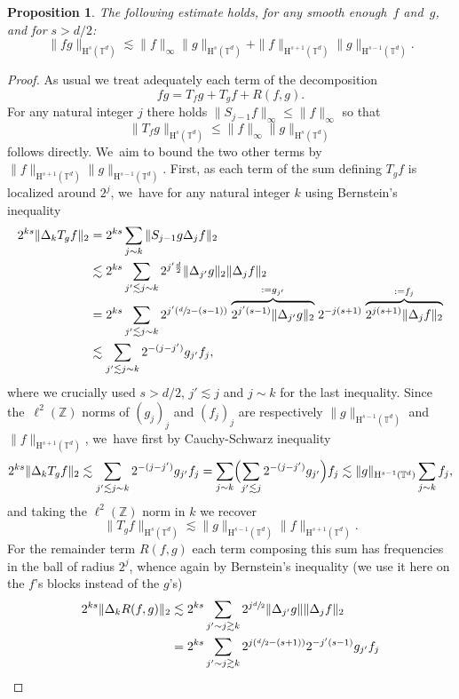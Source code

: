 \documentclass[10pt]{amsart}
\newtheorem{prop}{Proposition}[section]
\theoremstyle{definition}
\newcommand\Z{\mathbb{Z}}
\newcommand\T{\mathbb{T}}
\renewcommand\H{\mathrm{H}}
\begin{document}
\begin{prop}\label{prop:rhsSobo}
The following estimate holds, for any smooth enough~$f$ and~$g$, and for $s>d/2$:
\[
\|f g\|_{\H^s(\T^d)} \lesssim \|f\|_{\infty} \|g\|_{\H^s(\T^d)}+\|f\|_{\H^{s+1}(\T^d)}\|g\|_{\H^{s-1}(\T^d)}.
\]
\end{prop}
\begin{proof}
As usual we treat adequately each term of the decomposition
\[
fg = T_f g + T_g f + R(f,g).
\]
For any natural integer $j$ there holds $\|S_{j-1} f\|_\infty\leq \|f\|_\infty$ so that
\[
\|T_f g\|_{\H^s(\T^d)} \leq \|f\|_\infty \|g\|_{\H^s(\T^d)}
\]
follows directly. We~aim to bound the two other terms by $\|f\|_{\H^{s+1}(\T^d)}\|g\|_{\H^{s-1}(\T^d)}$. First, as each term of the sum defining $T_g f$ is localized around $2^j$, we~have for any natural integer $k$ using Bernstein's inequality
\begin{align*}
2^{ks}\|\Delta_k T_g f\|_2 &= 2^{ks} \sum_{j\sim k} \|S_{j-1} g \Delta_j f\|_2\\ &\lesssim 2^{ks} \sum_{j'\lesssim j \sim k} 2^{j'\frac{d}{2}}\|\Delta_{j'} g\|_2\|\Delta_j f\|_2\\[-10pt]
&= 2^{ks} \sum_{j'\lesssim j \sim k} 2^{j'(\sfrac{d}{2}-(s-1))} \stackrel{:=g_{j'}}{\overbrace{2^{j'(s-1)}\|\Delta_{j'} g\|_2}}2^{-j(s+1)}\stackrel{:=f_j}{\overbrace{2^{j(s+1)}\|\Delta_{j} f\|_2}}\\
&\lesssim \sum_{j'\lesssim j\sim k} 2^{-(j-j')} g_{j'} f_j,
\end{align*}
where we crucially used $s>d/2$, $j'\lesssim j$ and $j\sim k$ for the last inequality. Since the~$\ell^2(\Z)$ norms of $(g_j)_j$ and $(f_j)_j$ are respectively $\|g\|_{\H^{s-1}(\T^d)}$ and $\|f\|_{\H^{s+1}(\T^d)}$, we~have first by Cauchy-Schwarz inequality
\[
2^{ks}\|\Delta_k T_g f\|_2 \lesssim \sum_{j'\lesssim j\sim k} 2^{-(j-j')} g_{j'} f_j = \sum_{j\sim k} \Bigl(\sum_{j'\lesssim j} 2^{-(j-j')} g_{j'}\Bigr) f_j \lesssim \|g\|_{\H^{s-1}(\T^d)} \sum_{j\sim k} f_j,
\]
and taking the $\ell^2(\Z)$ norm in $k$ we recover
\[
\|T_g f\|_{\H^s(\T^d)}\lesssim \|g\|_{\H^{s-1}(\T^d)}\|f\|_{\H^{s+1}(\T^d)}.
\]
For the remainder term $R(f,g)$ each term composing this sum has frequencies in the ball of radius $2^j$, whence again by Bernstein's inequality (we use it here on the $f$'s blocks instead of the $g$'s)
\begin{align*}
2^{ks}\|\Delta_k R(f,g)\|_2 &\lesssim 2^{ks} \sum_{j'\sim j \gtrsim k} 2^{j\sfrac{d}{2}} \|\Delta_{j'} g\| \|\Delta_j f\|_2\\ &= 2^{ks} \sum_{j'\sim j \gtrsim k} 2^{j(\sfrac{d}{2}-(s+1))}2^{-j'(s-1)} g_{j'} f_j\\

\end{align*}
\end{proof}
\end{document}
